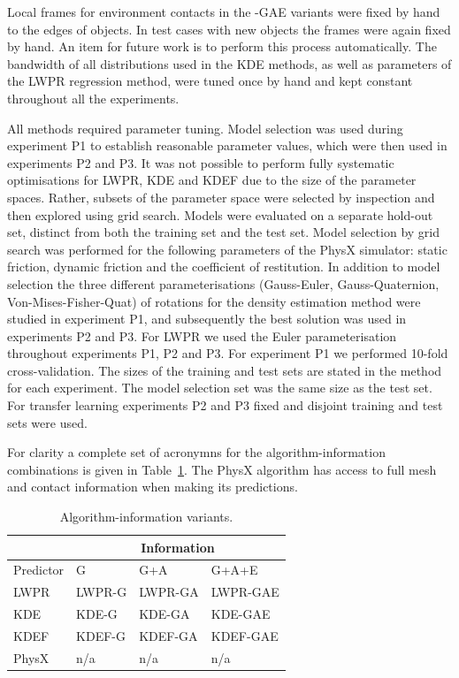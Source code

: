 Local frames for environment contacts in the -GAE variants were fixed
by hand to the edges of objects. In test cases with new objects the
frames were again fixed by hand.  An item for future work is to
perform this process automatically.  The bandwidth of all
distributions used in the KDE methods, as well as parameters of the
LWPR regression method, were tuned once by hand and kept constant
throughout all the experiments.

All methods required parameter tuning. Model selection was used during experiment P1 to establish reasonable parameter values, which were then used in experiments P2 and P3.  It was not possible to perform fully systematic optimisations for LWPR, KDE and KDEF due to the size of the parameter spaces.  Rather, subsets of the parameter space were selected by inspection and then explored using grid search.  Models were evaluated on a separate hold-out set, distinct from both the training set and the test set. Model selection by grid search was performed for the following parameters of the PhysX simulator: static friction, dynamic friction and the coefficient of restitution. In addition to model selection the three different parameterisations (Gauss-Euler, Gauss-Quaternion, Von-Mises-Fisher-Quat) of rotations for the density estimation method were studied in experiment P1, and subsequently the best solution was used in experiments P2 and P3. For LWPR we used the Euler parameterisation throughout experiments P1, P2 and P3. For experiment P1 we performed 10-fold cross-validation. The sizes of the training and test sets are stated in the method for each experiment. The model selection set was the same size as the test set. For transfer learning experiments P2 and P3 fixed and disjoint training and test sets were used.

For clarity a complete set of acronymns for the algorithm-information
combinations is given in Table~\ref{tab:algs}. The PhysX algorithm has
access to full mesh and contact information when making its
predictions.

\begin{table}[b]
\begin{center}
\begin{tabular}{|l|l|l|l|}\hline
 & \multicolumn{3}{|c|}{Information} \\ \hline
Predictor & G & G+A & G+A+E \\ \hline
LWPR & LWPR-G& LWPR-GA & LWPR-GAE \\ \hline
KDE & KDE-G & KDE-GA & KDE-GAE \\ \hline
KDEF & KDEF-G & KDEF-GA & KDEF-GAE \\ \hline
PhysX & n/a & n/a & n/a \\ \hline
\end{tabular}
\end{center}
\caption{Algorithm-information variants.}
\label{tab:algs}
\end{table}

